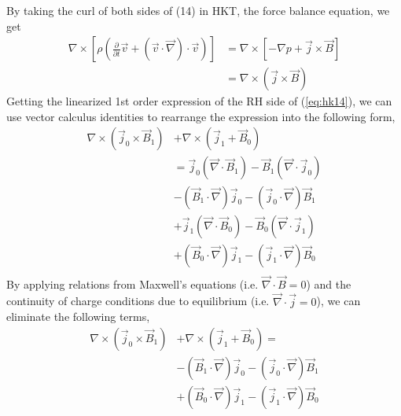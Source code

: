 \documentclass{article}
\begin{document}
By taking the curl of both sides of (14) in HKT, the force balance equation, we get
\begin{equation}
    \label{eq:hk14}
    \begin{split}
        \nabla \times \left[\rho \left( \frac{\partial}{\partial t} \vec{v} + \left( \vec{v} \cdot \vec{\nabla} \right) \cdot \vec{v} \right)\right] &= \nabla \times \left[- \nabla p + \vec{j}\times \vec{B}\right] \\
                                                                                                                                                     &= \nabla \times \left( \vec{j}\times \vec{B} \right) 
    \end{split}
\end{equation} 
Getting the linearized 1st order expression of the RH side of (\ref{eq:hk14}), we can use vector calculus identities to rearrange the expression into the following form,
\begin{equation}
    \begin{split}
        \nabla \times \left( \vec{j}_0 \times \vec{B}_1 \right) &+ \nabla \times \left( \vec{j}_1 + \vec{B}_0 \right) \\
                                                                &= \vec{j}_0 (\vec{\nabla} \cdot \vec{B}_1) - \vec{B}_1 (\vec{\nabla} \cdot \vec{j}_0) \\
                                                                &- \left( \vec{B}_1 \cdot \vec{\nabla}  \right) \vec{j}_0 - \left( \vec{j}_0 \cdot  \vec{\nabla}  \right) \vec{B}_1 \\
                                                                &+ \vec{j}_1 (\vec{\nabla} \cdot \vec{B}_0) - \vec{B}_0 (\vec{\nabla} \cdot \vec{j}_1) \\
                                                                &+ \left( \vec{B}_0 \cdot \vec{\nabla}  \right) \vec{j}_1 - \left( \vec{j}_1 \cdot  \vec{\nabla}  \right) \vec{B}_0 \\
    \end{split}
\end{equation} 
By applying relations from Maxwell's equations (i.e. $\vec{\nabla} \cdot \vec{B}=0$) and the continuity of charge conditions due to equilibrium (i.e. $\vec{\nabla} \cdot \vec{j}=0$), we can eliminate the following terms,
\begin{equation}
    \begin{split}
        \nabla \times \left( \vec{j}_0 \times \vec{B}_1 \right) &+ \nabla \times \left( \vec{j}_1 + \vec{B}_0 \right) = \\
                                                                &- \left( \vec{B}_1 \cdot \vec{\nabla}  \right) \vec{j}_0 - \left( \vec{j}_0 \cdot  \vec{\nabla}  \right) \vec{B}_1 \\
                                                                &+ \left( \vec{B}_0 \cdot \vec{\nabla}  \right) \vec{j}_1 - \left( \vec{j}_1 \cdot  \vec{\nabla}  \right) \vec{B}_0 \\
    \end{split}
\end{equation} 
\end{document}
